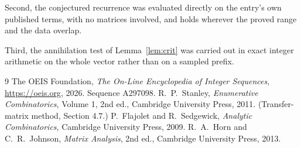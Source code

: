 \documentclass[11pt,a4paper]{article}
\theoremstyle{plain}
\theoremstyle{definition}
\begin{document}
Second, the conjectured recurrence was evaluated directly on the entry's own published terms,
with no matrices involved, and holds wherever the proved range and the data overlap.

Third, the annihilation test of Lemma~\ref{lem:crit} was carried out in exact integer
arithmetic on the whole vector rather than on a sampled prefix.

\begin{thebibliography}{9}
 The OEIS Foundation, \emph{The On-Line Encyclopedia of Integer
Sequences}, \url{https://oeis.org}, 2026. Sequence A297098.
 R.~P.~Stanley, \emph{Enumerative Combinatorics}, Volume 1, 2nd ed.,
Cambridge University Press, 2011. (Transfer-matrix method, Section 4.7.)
 P.~Flajolet and R.~Sedgewick, \emph{Analytic Combinatorics}, Cambridge
University Press, 2009.
 R.~A.~Horn and C.~R.~Johnson, \emph{Matrix Analysis}, 2nd ed., Cambridge
University Press, 2013.
\end{thebibliography}
\end{document}
